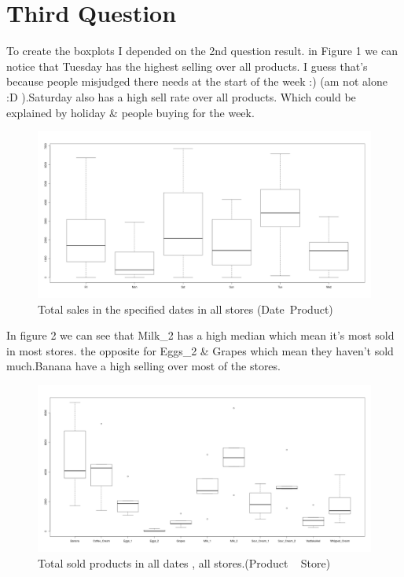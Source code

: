 \documentclass{article}
\begin{document}
		{\centering \section*{Third Question}}
To create the boxplots I depended on the 2nd question result.
in Figure 1 we can notice that Tuesday has the highest selling over all products. I guess that's because people misjudged there needs at the start of the week :) (am not alone :D ).Saturday also has a high sell rate over all products. Which could be explained by holiday \& people buying for the week.
\begin{figure}[H]
	\begin{center}
		\includegraphics[scale=0.3]{boxplotdates.png}
	\end{center}
	\caption{Total sales in the specified dates in all stores (Date~Product)}
\end{figure}
In figure 2 we can see that Milk\_2 has a high median which mean it's most sold in most stores.
the opposite for Eggs\_2 \& Grapes which mean they haven't sold much.Banana have a high selling over most of the stores.
\begin{figure}[H]
\begin{center}
	\includegraphics[scale=0.3]{boxplotproducts.png}
\end{center}
\caption{Total sold products in all dates , all stores.(Product ~ Store)}
\end{figure}
\end{document}
